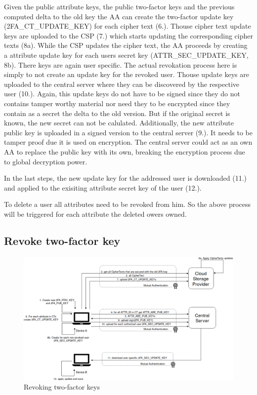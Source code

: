 Given the public attribute keys, the public two-factor keys and the previous computed delta to the old key the AA can create the two-factor update key (2FA\_CT\_UPDATE\_KEY) for each cipher text (6.). Thouse cipher text update keys are uploaded to the CSP (7.) which starts updating the corresponding cipher texts (8a). 
While the CSP updates the cipher text, the AA proceeds by creating a attribute update key for each users secret key (ATTR\_SEC\_UPDATE\_KEY, 8b). There keys are again user specific. The actual revokation process here is simply to not create an update key for the revoked user. Thouse update keys are uploaded to the central server where they can be discovered by the respective user (10.). Again, this update keys do not have to be signed since they do not contains tamper worthy material nor need they to be encrypted since they contain as a secret the delta to the old version. But if the original secret is known, the new secret can not be calulated. Additionally, the new attribute public key is uploaded in a signed version to the central server (9.). It needs to be tamper proof due it is used on encryption. The central server could act as an own AA to replace the public key with its own, breaking the encryption process due to global decryption power. 

In the last steps, the new update key for the addressed user is downloaded (11.) and applied to the exisiting attribute secret key of the user (12.).

To delete a user all attributes need to be revoked from him. So the above process will be triggered for each attribute the deleted owers owned.

\subsection{Revoke two-factor key}
\begin{figure}[!t]
\centering
    \includegraphics[width=1.0\linewidth]{img/2FA_revoke.png}
    \caption{Revoking two-factor keys}
    \label{fig:tfdacmacs-2FA-revokation}
\end{figure}

